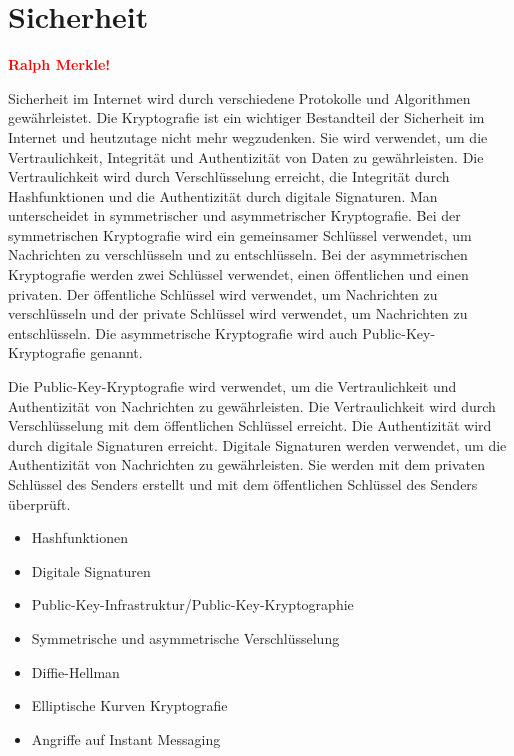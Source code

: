 \section{Sicherheit}
\label{sec:sicherheit_im}
\textbf{\textcolor{red}{Ralph Merkle!}}

\noindent Sicherheit im Internet wird durch verschiedene Protokolle und Algorithmen gewährleistet. Die Kryptografie ist ein wichtiger Bestandteil der Sicherheit im Internet und heutzutage nicht mehr wegzudenken. Sie wird verwendet, um die Vertraulichkeit, Integrität und Authentizität von Daten zu gewährleisten. Die Vertraulichkeit wird durch Verschlüsselung erreicht, die Integrität durch Hashfunktionen und die Authentizität durch digitale Signaturen. Man unterscheidet in symmetrischer und asymmetrischer Kryptografie. Bei der symmetrischen Kryptografie wird ein gemeinsamer Schlüssel verwendet, um Nachrichten zu verschlüsseln und zu entschlüsseln. Bei der asymmetrischen Kryptografie werden zwei Schlüssel verwendet, einen öffentlichen und einen privaten. Der öffentliche Schlüssel wird verwendet, um Nachrichten zu verschlüsseln und der private Schlüssel wird verwendet, um Nachrichten zu entschlüsseln. Die asymmetrische Kryptografie wird auch Public-Key-Kryptografie genannt.

\noindent Die Public-Key-Kryptografie wird verwendet, um die Vertraulichkeit und Authentizität von Nachrichten zu gewährleisten. Die Vertraulichkeit wird durch Verschlüsselung mit dem öffentlichen Schlüssel erreicht. Die Authentizität wird durch digitale Signaturen erreicht. Digitale Signaturen werden verwendet, um die Authentizität von Nachrichten zu gewährleisten. Sie werden mit dem privaten Schlüssel des Senders erstellt und mit dem öffentlichen Schlüssel des Senders überprüft.

\begin{itemize}
    \item Hashfunktionen
    \item Digitale Signaturen
    \item Public-Key-Infrastruktur/Public-Key-Kryptographie
    \item Symmetrische und asymmetrische Verschlüsselung
    \item Diffie-Hellman
    \item Elliptische Kurven Kryptografie
    \item Angriffe auf Instant Messaging
\end{itemize}
